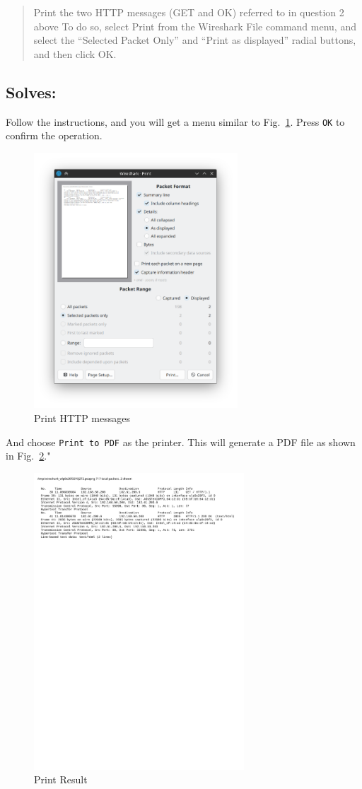\documentclass{cshwk}
\begin{document}
\begin{quote}
    Print the two HTTP messages (GET and OK) referred to in question 2 above To do so, select Print from the Wireshark File command menu, and select the
    “Selected Packet Only” and “Print as displayed” radial buttons, and then click OK.
\end{quote}

\subsection*{Solves:}

Follow the instructions, and you will get a menu similar to Fig.~\ref{fig:print}. Press \texttt{OK} to confirm the operation.

\begin{figure}[htbp]
    \centering
    \includegraphics[width=0.68\textwidth]{./lab1-4.png}
    \caption{Print HTTP messages}
    \label{fig:print}
\end{figure}

And choose \texttt{Print to PDF} as the printer. This will generate a PDF file as shown in Fig.~\ref{fig:pdf}."
\begin{figure}[htbp]
    \centering
    \includegraphics[width=0.7\textwidth]{./lab1-5.pdf}
    \caption{Print Result}
    \label{fig:pdf}
\end{figure}
\end{document}
